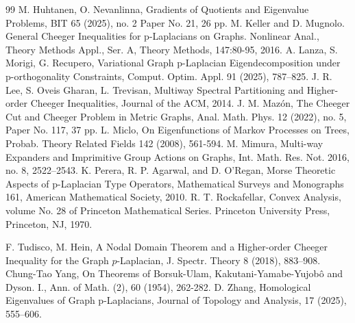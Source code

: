 \documentclass[12pt, reqno]{article}
\begin{document}
\begin{thebibliography}{99}
 M. Huhtanen, O. Nevanlinna, Gradients of Quotients and Eigenvalue Problems, BIT 65 (2025), no. 2 Paper No. 21, 26 pp.
 M. Keller and D. Mugnolo. General Cheeger Inequalities for p-Laplacians on Graphs. Nonlinear Anal., Theory Methods Appl., Ser. A, Theory Methods, 147:80-95, 2016.
 A. Lanza, S. Morigi, G. Recupero, Variational Graph p-Laplacian Eigendecomposition under p-orthogonality Constraints, Comput. Optim. Appl. 91 (2025), 787--825.
  J. R. Lee, S. Oveis Gharan, L. Trevisan, Multiway Spectral Partitioning and Higher-order Cheeger Inequalities, Journal of the ACM, 2014.
 J. M. Mazón, The Cheeger Cut and Cheeger Problem in Metric Graphs, Anal. Math. Phys. 12 (2022), no. 5, Paper No. 117, 37 pp.
 L. Miclo, On Eigenfunctions of Markov Processes on Trees, Probab. Theory Related Fields 142 (2008), 561-594.
 M. Mimura, Multi-way Expanders and Imprimitive Group Actions on Graphs, Int. Math. Res. Not. 2016, no. 8, 2522--2543.
 K. Perera, R. P. Agarwal, and D. O’Regan, Morse Theoretic Aspects of p-Laplacian Type Operators, Mathematical Surveys and Monographs 161, American Mathematical Society, 2010.
 R. T. Rockafellar,  Convex Analysis, volume No. 28 of Princeton Mathematical Series. Princeton University Press, Princeton, NJ, 1970.

 F. Tudisco, M. Hein, A Nodal Domain Theorem and a Higher-order Cheeger Inequality for the Graph $p$-Laplacian, J. Spectr. Theory 8 (2018), 883--908.
 Chung-Tao Yang, On Theorems of Borsuk-Ulam, Kakutani-Yamabe-Yujobô and Dyson. I., Ann. of Math. (2), 60 (1954), 262-282.
 D. Zhang, Homological Eigenvalues of Graph p-Laplacians, Journal of Topology and Analysis, 17 (2025), 555--606.
\end{thebibliography}
\end{document}
